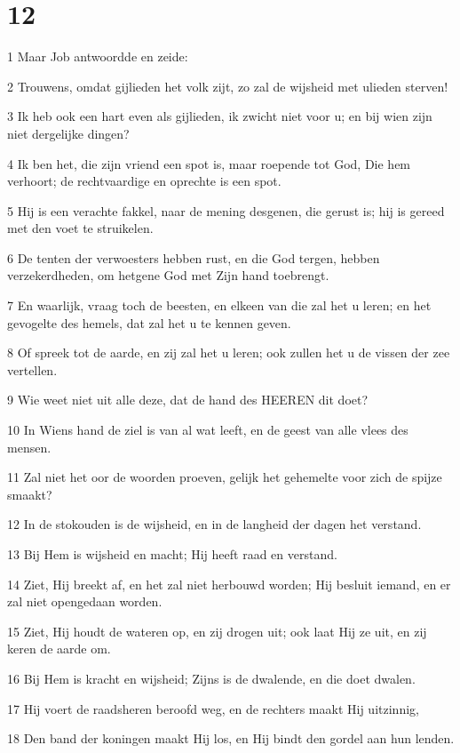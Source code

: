 \chapter{12}

\par 1 Maar Job antwoordde en zeide:
\par 2 Trouwens, omdat gijlieden het volk zijt, zo zal de wijsheid met ulieden sterven!
\par 3 Ik heb ook een hart even als gijlieden, ik zwicht niet voor u; en bij wien zijn niet dergelijke dingen?
\par 4 Ik ben het, die zijn vriend een spot is, maar roepende tot God, Die hem verhoort; de rechtvaardige en oprechte is een spot.
\par 5 Hij is een verachte fakkel, naar de mening desgenen, die gerust is; hij is gereed met den voet te struikelen.
\par 6 De tenten der verwoesters hebben rust, en die God tergen, hebben verzekerdheden, om hetgene God met Zijn hand toebrengt.
\par 7 En waarlijk, vraag toch de beesten, en elkeen van die zal het u leren; en het gevogelte des hemels, dat zal het u te kennen geven.
\par 8 Of spreek tot de aarde, en zij zal het u leren; ook zullen het u de vissen der zee vertellen.
\par 9 Wie weet niet uit alle deze, dat de hand des HEEREN dit doet?
\par 10 In Wiens hand de ziel is van al wat leeft, en de geest van alle vlees des mensen.
\par 11 Zal niet het oor de woorden proeven, gelijk het gehemelte voor zich de spijze smaakt?
\par 12 In de stokouden is de wijsheid, en in de langheid der dagen het verstand.
\par 13 Bij Hem is wijsheid en macht; Hij heeft raad en verstand.
\par 14 Ziet, Hij breekt af, en het zal niet herbouwd worden; Hij besluit iemand, en er zal niet opengedaan worden.
\par 15 Ziet, Hij houdt de wateren op, en zij drogen uit; ook laat Hij ze uit, en zij keren de aarde om.
\par 16 Bij Hem is kracht en wijsheid; Zijns is de dwalende, en die doet dwalen.
\par 17 Hij voert de raadsheren beroofd weg, en de rechters maakt Hij uitzinnig,
\par 18 Den band der koningen maakt Hij los, en Hij bindt den gordel aan hun lenden.
